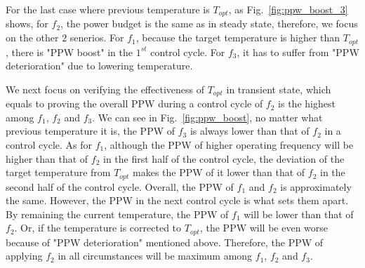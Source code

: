 For the last case where previous temperature is $T_{opt}$, as Fig.~\ref{fig:ppw_boost_3} shows, for $f_{2}$, the power budget is the same as in steady state, therefore, we focus on the other $2$ senerios. For $f_{1}$, because the target temperature is higher than $T_{opt}$, there is "PPW boost" in the $1^{st}$ control cycle. For $f_{3}$, it has to suffer from "PPW deterioration" due to lowering temperature.


We next focus on verifying the effectiveness of $T_{opt}$ in transient state, which equals to proving the overall PPW during a control cycle of $f_{2}$ is the highest among $f_{1}$, $f_{2}$ and $f_{3}$. We can see in Fig.~\ref{fig:ppw_boost}, no matter what previous temperature it is, the PPW of $f_{3}$ is always lower than that of $f_{2}$ in a control cycle. As for $f_{1}$, although the PPW of higher operating frequency will be higher than that of $f_{2}$ in the first half of the control cycle, the deviation of the target temperature from $T_{opt}$ makes the PPW of it lower than that of $f_{2}$ in the second half of the control cycle. Overall, the PPW of $f_{1}$ and $f_{2}$ is approximately the same. However, the PPW in the next control cycle is what sets them apart. By remaining the current temperature, the PPW of $f_{1}$ will be lower than that of $f_{2}$. Or, if the temperature is corrected to $T_{opt}$, the PPW will be even worse because of "PPW deterioration" mentioned above. Therefore, the PPW of applying $f_{2}$ in all circumstances will be maximum among $f_{1}$, $f_{2}$ and $f_{3}$.








